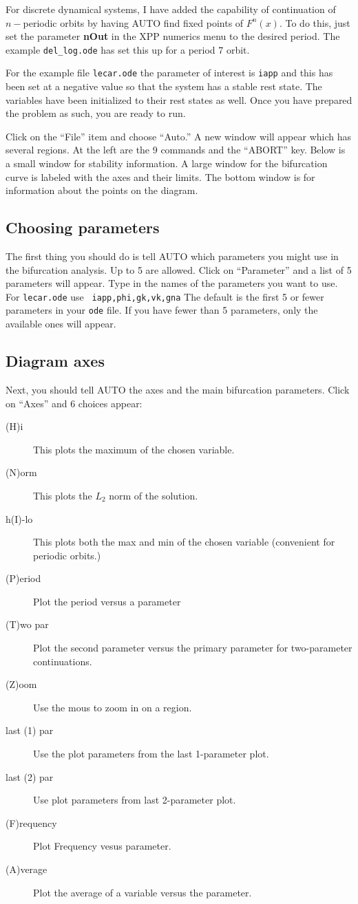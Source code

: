 \documentclass{article}
\begin{document}
For discrete dynamical systems, I have added the capability of
continuation of $n-$periodic orbits by having AUTO find fixed points
of $F^n(x).$ To do this, just set the parameter {\bf nOut} in the XPP
numerics menu to the desired period. The example {\tt del\_log.ode} has
set this up for a period 7 orbit.

For the example file {\tt lecar.ode} the parameter
of interest is {\tt iapp} and this has been set at a negative value so
that the system has a stable rest state.  The variables have been
initialized to their rest states as well.  Once you have prepared the
problem as such, you are ready to run.

Click on the ``File'' item and choose ``Auto.''  A new window will
appear which has several regions.  At the left are the 9 commands and
the ``ABORT'' key.  Below is a small window for stability information.
A large window for the bifurcation curve is labeled with the axes and
their limits.  The bottom window is for information about the points
on the diagram.  

\subsection{Choosing parameters}

The first thing you should do is tell AUTO which parameters you might
use in the bifurcation analysis. Up to 5 are allowed.  Click on
``Parameter'' and a list of 5 parameters will appear.  Type in the
names of the parameters you want to use.  For {\tt lecar.ode} use {\tt
iapp,phi,gk,vk,gna}  The default is the first 5 or fewer parameters
in your {\tt ode} file. If you have fewer than 5 parameters, only the
available ones will appear.  
\subsection{Diagram axes}

Next, you should tell AUTO the axes and the main bifurcation
parameters.  Click on ``Axes'' and 6 choices appear:
\begin{description}
\item[(H)i] This plots the maximum of the chosen variable.
\item[(N)orm]  This plots the $L_2$ norm of the solution.
\item[h(I)-lo] This plots both the max and min of the chosen variable
(convenient for periodic orbits.)
\item[(P)eriod] Plot the period versus a parameter
\item[(T)wo par] Plot the second parameter versus the primary
parameter for two-parameter continuations.
\item[(Z)oom] Use the mous to zoom in on a region.
\item[last (1) par] Use the plot parameters from the last 1-parameter
plot.
\item[last (2) par] Use plot parameters from last 2-parameter plot.
\item[(F)requency ] Plot Frequency vesus parameter.
\item[(A)verage ] Plot the average of a variable versus the parameter. 
\end{description}
\end{document}
